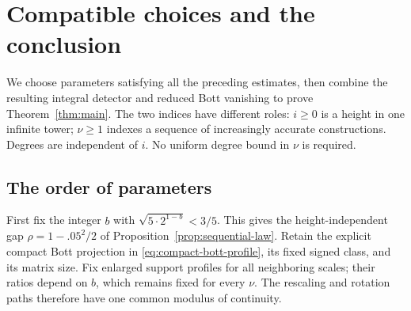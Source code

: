 \section{Compatible choices and the conclusion}
\label{sec:completion}

We choose parameters satisfying all the preceding estimates, then combine
the resulting integral detector and reduced Bott vanishing to prove
Theorem~\ref{thm:main}.  The two indices have different roles:
$i\geq0$ is a height in one infinite
tower; $\nu\geq1$ indexes a sequence of increasingly accurate
constructions.  Degrees are independent of $i$.  No uniform degree
bound in $\nu$ is required.

\subsection{The order of parameters}

First fix the integer $b$ with
$\sqrt{5\cdot2^{1-b}}<3/5$.  This gives the height-independent gap
$\rho=1-.05^2/2$ of Proposition~\ref{prop:sequential-law}.
Retain the explicit compact Bott projection in
\eqref{eq:compact-bott-profile}, its fixed signed class, and
its matrix size.  Fix enlarged support profiles for all neighboring
scales; their ratios depend on $b$, which remains fixed for every
$\nu$.  The rescaling and rotation paths therefore have one common
modulus of continuity.

